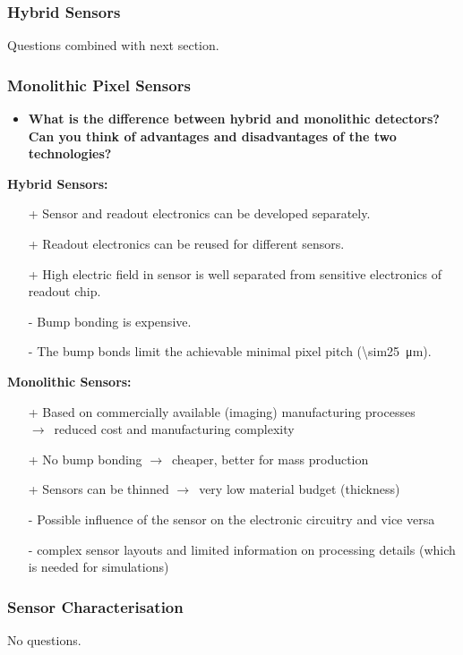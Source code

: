 \documentclass[a4paper,11pt]{article}
\begin{document}
\subsubsection{Hybrid Sensors}
Questions combined with next section.

\subsubsection{Monolithic Pixel Sensors}
\begin{itemize}
\item \textbf{What is the difference between hybrid and monolithic detectors? Can you think of advantages and disadvantages of the two technologies?}
\end{itemize}

\textbf{Hybrid Sensors:}
\begin{itemize}
\item[+] Sensor and readout electronics can be developed separately.
\item[+] Readout electronics can be reused for different sensors.
\item[+] High electric field in sensor is well separated from sensitive electronics of readout chip.
\item[-] Bump bonding is expensive.
\item[-] The bump bonds limit the achievable minimal pixel pitch (\SI{\sim25}{\micro m}).
\end{itemize}
\textbf{Monolithic Sensors:}
\begin{itemize}
\item[+] Based on commercially available (imaging) manufacturing processes\\ $\rightarrow$~reduced cost and manufacturing complexity
\item[+] No bump bonding $\rightarrow$~cheaper, better for mass production
\item[+] Sensors can be thinned $\rightarrow$~very low material budget (thickness)
\item[-] Possible influence of the sensor on the electronic circuitry and vice versa
\item[-] complex sensor layouts and limited information on processing details (which is needed for simulations)
\end{itemize}

\subsubsection{Sensor Characterisation}
No questions.
\end{document}
